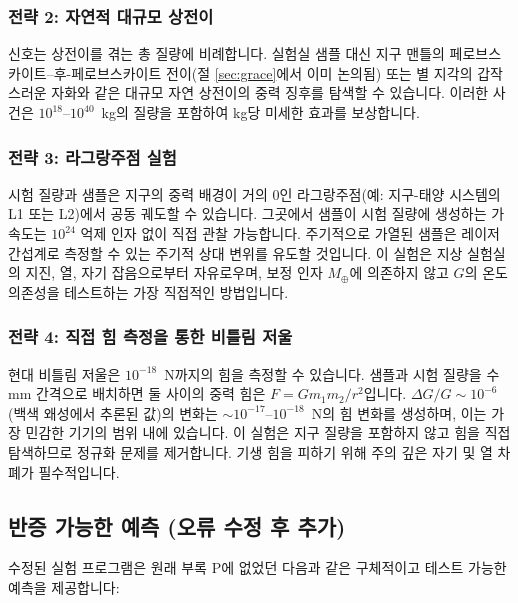 \documentclass[11pt,a4paper]{article}
\begin{document}
	\subsubsection*{전략 2: 자연적 대규모 상전이}
	신호는 상전이를 겪는 총 질량에 비례합니다. 실험실 샘플 대신 지구 맨틀의 페로브스카이트–후-페로브스카이트 전이(절 \ref{sec:grace}에서 이미 논의됨) 또는 별 지각의 갑작스러운 자화와 같은 대규모 자연 상전이의 중력 징후를 탐색할 수 있습니다. 이러한 사건은 $10^{18}$–$10^{40}$~kg의 질량을 포함하여 kg당 미세한 효과를 보상합니다.
	
	\subsubsection*{전략 3: 라그랑주점 실험}
	시험 질량과 샘플은 지구의 중력 배경이 거의 0인 라그랑주점(예: 지구-태양 시스템의 L1 또는 L2)에서 공동 궤도할 수 있습니다. 그곳에서 샘플이 시험 질량에 생성하는 가속도는 $10^{24}$ 억제 인자 없이 직접 관찰 가능합니다. 주기적으로 가열된 샘플은 레이저 간섭계로 측정할 수 있는 주기적 상대 변위를 유도할 것입니다. 이 실험은 지상 실험실의 지진, 열, 자기 잡음으로부터 자유로우며, 보정 인자 $M_\oplus$에 의존하지 않고 $G$의 온도 의존성을 테스트하는 가장 직접적인 방법입니다.
	
	\subsubsection*{전략 4: 직접 힘 측정을 통한 비틀림 저울}
	현대 비틀림 저울은 $10^{-18}$~N까지의 힘을 측정할 수 있습니다. 샘플과 시험 질량을 수 mm 간격으로 배치하면 둘 사이의 중력 힘은 $F = G m_1 m_2 / r^2$입니다. $\Delta G / G \sim 10^{-6}$ (백색 왜성에서 추론된 값)의 변화는 $\sim 10^{-17}$–$10^{-18}$~N의 힘 변화를 생성하며, 이는 가장 민감한 기기의 범위 내에 있습니다. 이 실험은 지구 질량을 포함하지 않고 힘을 직접 탐색하므로 정규화 문제를 제거합니다. 기생 힘을 피하기 위해 주의 깊은 자기 및 열 차폐가 필수적입니다.
	
	\subsection{반증 가능한 예측 (오류 수정 후 추가)}
	\label{subsec:new-predictions}
	
	수정된 실험 프로그램은 원래 부록 P에 없었던 다음과 같은 구체적이고 테스트 가능한 예측을 제공합니다:
	
\end{document}
